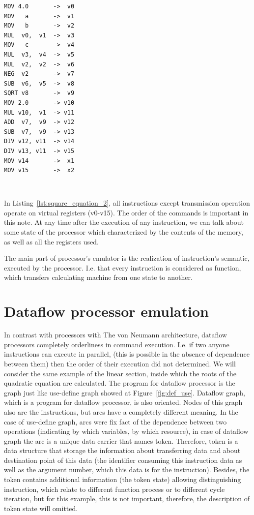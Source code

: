 \documentclass[
11pt,%
tightenlines,%
twoside,%
onecolumn,%
nofloats,%
nobibnotes,%
nofootinbib,%
superscriptaddress,%
noshowpacs,%
centertags]%
{revtex4}
\begin{document}
\begin{lstlisting}[caption={Pseudocode for calculating the roots of a quadratic equation.},label={lst:square_equation_2}]
MOV 4.0       ->  v0
MOV   a       ->  v1
MOV   b       ->  v2
MUL  v0,  v1  ->  v3
MOV   c       ->  v4
MUL  v3,  v4  ->  v5
MUL  v2,  v2  ->  v6
NEG  v2       ->  v7
SUB  v6,  v5  ->  v8
SQRT v8       ->  v9
MOV 2.0       -> v10
MUL v10,  v1  -> v11
ADD  v7,  v9  -> v12
SUB  v7,  v9  -> v13
DIV v12, v11  -> v14
DIV v13, v11  -> v15
MOV v14       ->  x1
MOV v15       ->  x2
\end{lstlisting}

\

In Listing~\ref{lst:square_equation_2}, all instructions except transmission operation operate on virtual registers (v0-v15). The order of the commands is important in this note. At any time after the execution of any instruction, we can talk about some state of the processor which characterized by the contents of the memory, as well as all the registers used.

The main part of processor’s emulator is the realization of instruction’s semantic, executed by the processor. I.e. that every instruction is considered as function, which transfers calculating machine from one state to another.

\section{Dataflow processor emulation}

In contrast with processors with The von Neumann architecture, dataflow processors completely orderliness in command execution. I.e. if two anyone instructions can execute in parallel, (this is possible in the absence of dependence between them) then the order of their execution did not determined. We will consider the same example of the linear section, inside which the roots of the quadratic equation are calculated. The program for dataflow processor is the graph just like use-define graph showed at Figure~\ref{fig:def_use}.
Dataflow graph, which is a program for dataflow processor, is also oriented. Nodes of this graph also are the instructions, but arcs have a completely different meaning. In the case of use-define graph, arcs were fix fact of the dependence between two operations (indicating by which variables, by which resource), in case of dataflow graph the arc is a unique data carrier that names token. Therefore, token is a data structure that storage the information about transferring data and about destination point of this data (the identifier consuming this instruction data as well as the argument number, which this data is for the instruction). Besides, the token contains additional information (the token state) allowing distinguishing instruction, which relate to different function process or to different cycle iteration, but for this example, this is not important, therefore, the description of token state will omitted.
\end{document}
